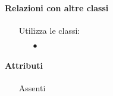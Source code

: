 \paragraph*{Relazioni con altre classi}
\begin{itemize}


\item[] Utilizza le classi:
\begin{itemize}
\item[$\bullet$] 
\end{itemize}
\end{itemize}

\paragraph*{Attributi}
\begin{itemize}
\item[] Assenti
\end{itemize}

